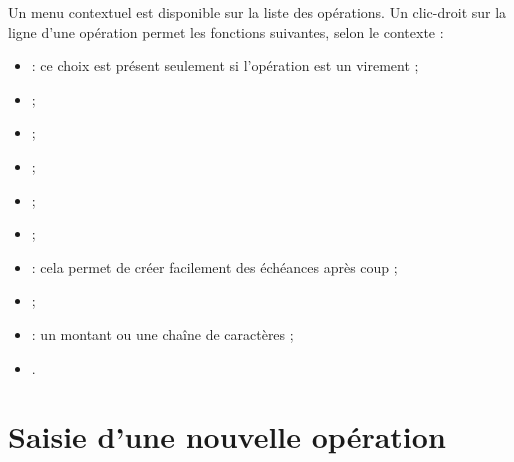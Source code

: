 Un menu contextuel est disponible sur la liste des opérations. Un clic-droit sur la ligne d'une opération permet les fonctions suivantes, selon le contexte :

\begin{itemize}
	\ifIllustration
	\label{transactions-contextMenu-img}
	\fi
	 \item {} : ce choix est présent seulement si l'opération est un virement ;
	 \item {} ;
	 \item {} ;
	 \item {} ;
	 \item {} ;
	 \item {} ;
	 \item {} : cela permet de créer facilement des échéances après coup ;
	 \item {} ;
	 \item {} : un montant ou une chaîne de caractères ; 
	 \item {}.
\end{itemize}


\section{Saisie d'une nouvelle opération\label{transactions-new}}



